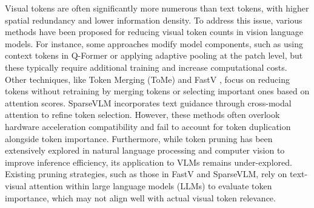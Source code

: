 Visual tokens are often significantly more numerous than text tokens, with higher spatial redundancy and lower information density. To address this issue, various methods have been proposed for reducing visual token counts in vision language models. For instance, some approaches modify model components, such as using context tokens in Q-Former \citep{li2023llama} or applying adaptive pooling at the patch level, but these typically require additional training and increase computational costs. Other techniques, like Token Merging (ToMe) \citep{bolya2022tome} and FastV \citep{chen2024image}, focus on reducing tokens without retraining by merging tokens or selecting important ones based on attention scores. SparseVLM \cite{zhang2024sparsevlm} incorporates text guidance through cross-modal attention to refine token selection. However, these methods often overlook hardware acceleration compatibility and fail to account for token duplication alongside token importance. Furthermore, while token pruning has been extensively explored in natural language processing and computer vision to improve inference efficiency, its application to VLMs remains under-explored. Existing pruning strategies, such as those in FastV and SparseVLM, rely on text-visual attention within large language models (LLMs) to evaluate token importance, which may not align well with actual visual token relevance.

